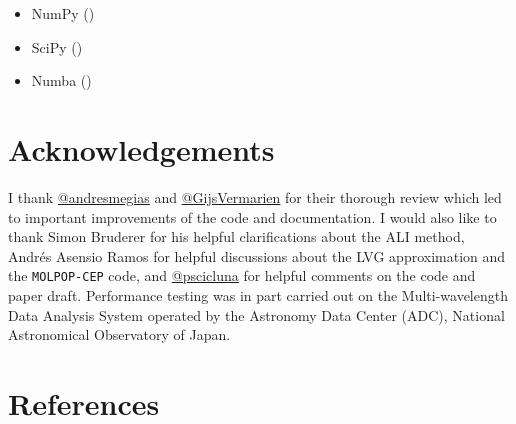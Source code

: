 \documentclass[
]{article}
\providecommand{\tightlist}{%
  \setlength{\itemsep}{0pt}\setlength{\parskip}{0pt}}
\begin{document}
\begin{itemize}
\tightlist
\item
  NumPy ()
\item
  SciPy ()
\item
  Numba ()
\end{itemize}

\section{Acknowledgements}\label{acknowledgements}

I thank \href{https://github.com/andresmegias}{@andresmegias} and
\href{https://github.com/GijsVermarien}{@GijsVermarien} for their
thorough review which led to important improvements of the code and
documentation. I would also like to thank Simon Bruderer for his helpful
clarifications about the ALI method, Andrés Asensio Ramos for helpful
discussions about the LVG approximation and the \texttt{MOLPOP-CEP}
code, and \href{https://github.com/pscicluna}{@pscicluna} for helpful
comments on the code and paper draft. Performance testing was in part
carried out on the Multi-wavelength Data Analysis System operated by the
Astronomy Data Center (ADC), National Astronomical Observatory of Japan.

\section*{References}\label{references}
\end{document}
